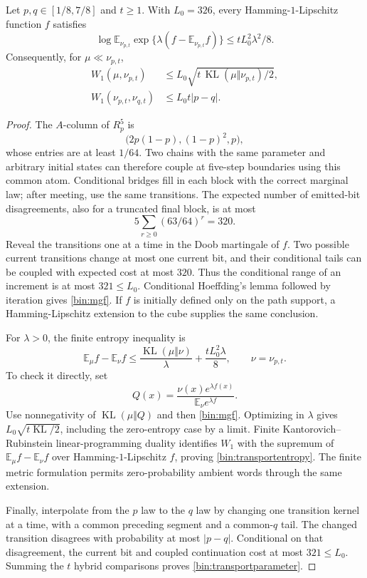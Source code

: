 \begin{lemma}
\label{bin:entropy}
Let $p,q\in[1/8,7/8]$ and $t\ge1$. With $L_0=326$, every Hamming-$1$-Lipschitz function $f$ satisfies
\begin{equation}
 \log\mathbb E_{\nu_{p,t}}
       \exp\{\lambda(f-\mathbb E_{\nu_{p,t}}f)\}
       \le tL_0^2\lambda^2/8.
 \label{bin:mgf}
\end{equation}
Consequently, for $\mu\ll\nu_{p,t}$,
\begin{align}
 W_1(\mu,\nu_{p,t})&\le L_0\sqrt{t\,\operatorname{KL}(\mu\Vert\nu_{p,t})/2},
 \label{bin:transportentropy}\\
 W_1(\nu_{p,t},\nu_{q,t})&\le L_0t|p-q|.
 \label{bin:transportparameter}
\end{align}
\end{lemma}
\begin{proof}
The $A$-column of $R_p^5$ is
\[
 \bigl(2p(1-p),(1-p)^2,p\bigr),
\]
whose entries are at least $1/64$. Two chains with the same parameter and arbitrary initial states can therefore couple at five-step boundaries using this common atom. Conditional bridges fill in each block with the correct marginal law; after meeting, use the same transitions. The expected number of emitted-bit disagreements, also for a truncated final block, is at most
\[
 5\sum_{r\ge0}(63/64)^r=320.
\]
Reveal the transitions one at a time in the Doob martingale of $f$. Two possible current transitions change at most one current bit, and their conditional tails can be coupled with expected cost at most $320$. Thus the conditional range of an increment is at most $321\le L_0$. Conditional Hoeffding's lemma followed by iteration gives \eqref{bin:mgf}. If $f$ is initially defined only on the path support, a Hamming-Lipschitz extension to the cube supplies the same conclusion.

For $\lambda>0$, the finite entropy inequality is
\[
 \mathbb E_\mu f-\mathbb E_\nu f
 \le\frac{\operatorname{KL}(\mu\Vert\nu)}\lambda
       +\frac{tL_0^2\lambda}{8},\qquad\nu=\nu_{p,t}.
\]
To check it directly, set
\[
 Q(x)=\frac{\nu(x)e^{\lambda f(x)}}{\mathbb E_\nu e^{\lambda f}}.
\]
Use nonnegativity of $\operatorname{KL}(\mu\Vert Q)$ and then \eqref{bin:mgf}. Optimizing in $\lambda$ gives $L_0\sqrt{t\operatorname{KL}/2}$, including the zero-entropy case by a limit. Finite Kantorovich--Rubinstein linear-programming duality identifies $W_1$ with the supremum of $\mathbb E_\mu f-\mathbb E_\nu f$ over Hamming-$1$-Lipschitz $f$, proving \eqref{bin:transportentropy}. The finite metric formulation permits zero-probability ambient words through the same extension.

Finally, interpolate from the $p$ law to the $q$ law by changing one transition kernel at a time, with a common preceding segment and a common-$q$ tail. The changed transition disagrees with probability at most $|p-q|$. Conditional on that disagreement, the current bit and coupled continuation cost at most $321\le L_0$. Summing the $t$ hybrid comparisons proves \eqref{bin:transportparameter}.
\end{proof}

